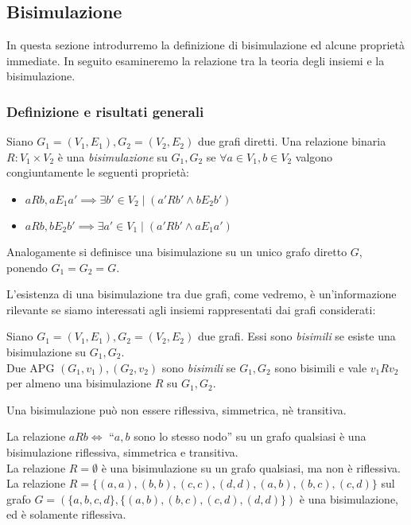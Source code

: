 \subsection{Bisimulazione}
In questa sezione introdurremo la definizione di bisimulazione ed alcune proprietà immediate. In seguito esamineremo la relazione tra la teoria degli insiemi e la bisimulazione.
\subsubsection{Definizione e risultati generali}
\begin{definition}
    Siano $G_1 = (V_1,E_1), G_2 = (V_2,E_2)$ due grafi diretti. Una relazione binaria $R: V_1 \times V_2$ è una \emph{bisimulazione} su $G_1, G_2$ se $\forall a \in V_1, b \in V_2$ valgono congiuntamente le seguenti proprietà:
    \begin{itemize}
        \item $a R b, a E_1 a' \implies \exists b' \in V_2 \mid (a' R b' \land b E_2 b')$
        \item $a R b, b E_2 b' \implies \exists a' \in V_1 \mid (a' R b' \land a E_1 a')$
    \end{itemize}
    Analogamente si definisce una bisimulazione su un unico grafo diretto $G$, ponendo $G_1 = G_2 = G$.
\end{definition}
L'esistenza di una bisimulazione tra due grafi, come vedremo, è un'informazione rilevante se siamo interessati agli insiemi rappresentati dai grafi considerati:
\begin{definition}
    Siano $G_1 = (V_1,E_1), G_2 = (V_2,E_2)$ due grafi. Essi sono \emph{bisimili} se esiste una bisimulazione su $G_1, G_2$.\\
    Due APG $(G_1, v_1), (G_2, v_2)$ sono \emph{bisimili} se $G_1, G_2$ sono bisimili e vale $v_1 R v_2$ per almeno una bisimulazione $R$ su $G_1, G_2$.
\end{definition}
\begin{observation}
    Una bisimulazione può non essere riflessiva, simmetrica, nè transitiva.
\end{observation}
\begin{example}
    La relazione $a R b \iff$ ``$a,b$ sono lo stesso nodo'' su un grafo qualsiasi è una bisimulazione riflessiva, simmetrica e transitiva.\\
    La relazione $R = \emptyset$ è una bisimulazione su un grafo qualsiasi, ma non è riflessiva.\\
    La relazione $R = \{(a,a),(b,b),(c,c),(d,d),(a,b),(b,c),(c,d)\}$ sul grafo $G = (\{a,b,c,d\}, \{(a,b),(b,c),(c,d),(d,d)\})$ è una bisimulazione, ed è solamente riflessiva.
\end{example}
